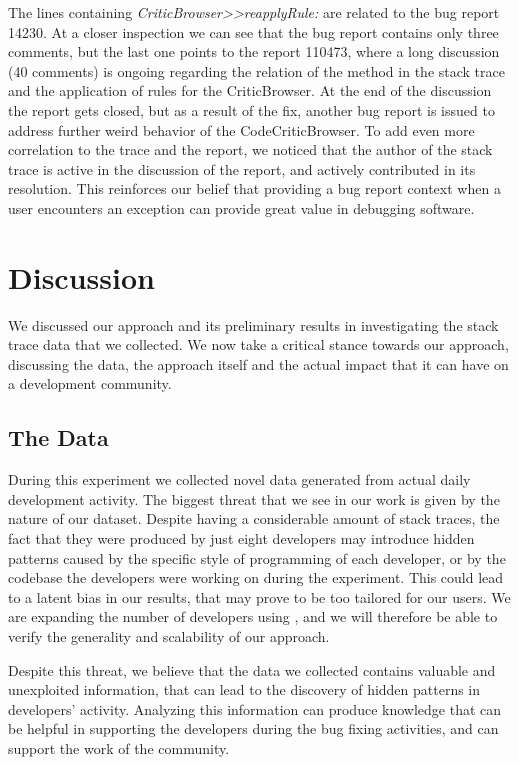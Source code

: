 The lines containing \emph{CriticBrowser{>}{>}reapplyRule:} are related to the bug report 14230.
At a closer inspection we can see that the bug report contains only three comments, but the last one points to the report 110473, where a long discussion (40 comments) is ongoing regarding the relation of the method in the stack trace and the application of rules for the CriticBrowser.
At the end of the discussion the report gets closed, but as a result of the fix, another bug report is issued to address further weird behavior of the CodeCriticBrowser.
To add even more correlation to the trace and the report, we noticed that the author of the stack trace is active in the discussion of the report, and actively contributed in its resolution.
This reinforces our belief that providing a bug report context when a user encounters an exception can provide great value in debugging software.




\section{Discussion}\label{sec:stacktraces-discussion}

We discussed our approach and its preliminary results in investigating the stack trace data that we collected.
We now take a critical stance towards our approach, discussing the data, the approach itself and the actual impact that it can have on a development community.


\subsection{The Data}

During this experiment we collected novel data generated from actual daily development activity.
The biggest threat that we see in our work is given by the nature of our dataset.
Despite having a considerable amount of stack traces, the fact that they were produced by just eight developers may introduce hidden patterns caused by the specific style of programming of each developer, or by the codebase the developers were working on during the experiment.
This could lead to a latent bias in our results, that may prove to be too tailored for our users.
We are expanding the number of developers using \slr, and we will therefore be able to verify the generality and scalability of our approach.

Despite this threat, we believe that the data we collected contains valuable and unexploited information, that can lead to the discovery of hidden patterns in developers' activity.
Analyzing this information can produce knowledge that can be helpful in supporting the developers during the bug fixing activities, and can support the work of the community.


